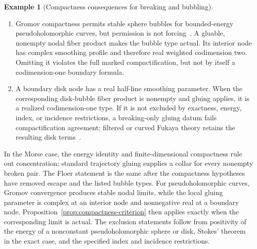 \documentclass[11pt,letterpaper,twoside]{article}
\theoremstyle{plain}
\theoremstyle{definition}
\newtheorem{example}[theorem]{Example}
\theoremstyle{remark}
\let\cite\citep
\begin{document}
\begin{example}[Compactness consequences for breaking and bubbling]
\begin{enumerate}
Monotonicity neither removes disk bubbles nor raises their codimension.  A disk bubble has codimension one for every value of the minimal Maslov number \(N_L\), since its Maslov index cancels in the dimension count against the index lost by the remaining strip.  Instead, monotonicity can supply an emptiness argument.  For a pair of monotone Lagrangians with minimal Maslov numbers \(\geq3\), a bubble of Maslov index \(\mu\geq3\) leaves a strip component of index \(2-\mu<0\).  This component is empty for generic data, so no disk-bubbled configuration occurs in the boundary of the one-dimensional strip moduli and \(\partial^2=0\)~\cite[Thm.~16.4.5]{oh2015vol2}.  When a minimal Maslov number equals \(2\), the remaining strip is constant and the bubbles contribute the count of Maslov-two disks through a generic point, a multiple of the unit.  The square of the differential is then the difference of two such counts~\cite[Thm.~16.4.7, Cor.~16.4.8]{oh2015vol2}.  Section~\ref{sec:curved} treats this regime~\cite{floer1988,fooo2009,seidel2008}.
\item Gromov compactness permits stable sphere bubbles for bounded-energy pseudoholomorphic curves, but permission is not forcing~\cite{gromov1985}.  A gluable, nonempty nodal fiber product makes the bubble type actual.  Its interior node has complex smoothing profile and therefore real weighted codimension two.  Omitting it violates the full marked compactification, but not by itself a codimension-one boundary formula.
\item A boundary disk node has a real half-line smoothing parameter.  When the corresponding disk-bubble fiber product is nonempty and gluing applies, it is a realized codimension-one type.  If it is not excluded by exactness, energy, index, or incidence restrictions, a breaking-only gluing datum fails compactification agreement; filtered or curved Fukaya theory retains the resulting disk terms~\cite{fooo2009,fooo2020}.
\end{enumerate}
In the Morse case, the energy identity and finite-dimensional compactness rule out concentration; standard trajectory gluing supplies a collar for every nonempty broken pair.  The Floer statement is the same after the compactness hypotheses have removed escape and the listed bubble types.  For pseudoholomorphic curves, Gromov convergence produces stable nodal limits, while the local gluing parameter is complex at an interior node and nonnegative real at a boundary node.  Proposition~\ref{prop:compactness-criterion} then applies exactly when the corresponding limit is actual.  The exclusion statements follow from positivity of the energy of a nonconstant pseudoholomorphic sphere or disk, Stokes' theorem in the exact case, and the specified index and incidence restrictions.
\end{example}
\end{document}
